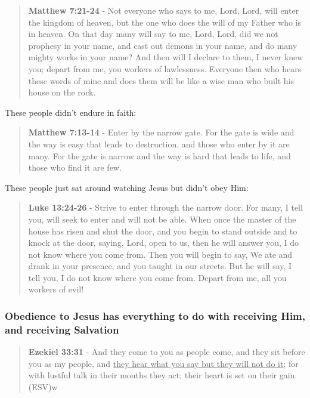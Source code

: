 \documentclass[11pt]{article}
\begin{document}
\begin{quote}
\textbf{Matthew 7:21-24} - Not everyone who says to me, Lord, Lord, will enter the kingdom of heaven, but the one who does the will of my Father who is in heaven. On that day many will say to me, Lord, Lord, did we not prophesy in your name, and cast out demons in your name, and do many mighty works in your name? And then will I declare to them, I never knew you; depart from me, you workers of lawlessness. Everyone then who hears these words of mine and does them will be like a wise man who built his house on the rock.
\end{quote}

These people didn't endure in faith:

\begin{quote}
\textbf{Matthew 7:13-14} - Enter by the narrow gate. For the gate is wide and the way is easy that leads to destruction, and those who enter by it are many. For the gate is narrow and the way is hard that leads to life, and those who find it are few.
\end{quote}

These people just sat around watching Jesus but didn't obey Him:

\begin{quote}
\textbf{Luke 13:24-26} - Strive to enter through the narrow door. For many, I tell you, will seek to enter and will not be able. When once the master of the house has risen and shut the door, and you begin to stand outside and to knock at the door, saying, Lord, open to us, then he will answer you, I do not know where you come from. Then you will begin to say, We ate and drank in your presence, and you taught in our streets. But he will say, I tell you, I do not know where you come from. Depart from me, all you workers of evil!
\end{quote}

\subsubsection{Obedience to Jesus has everything to do with receiving Him, and receiving Salvation}
\label{sec:org4e0d569}
\begin{quote}
\textbf{Ezekiel 33:31} - And they come to you as people come, and they sit before you as my people, and \uline{they hear what you say but they will not do it}; for with lustful talk in their mouths they act; their heart is set on their gain. (ESV)w
\end{quote}
\end{document}
